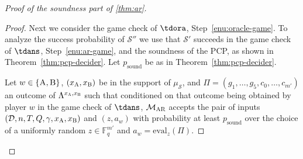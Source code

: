 \documentclass[11pt]{article}
\theoremstyle{definition}
\newcommand{\F}{\ensuremath{\mathbb{F}}}
\newcommand{\sampler}{\mathcal{S}}
\newcommand{\decider}{\mathcal{D}}
\newcommand{\strategy}{\mathscr{S}}
\newcommand{\gamestyle}[1]{\ensuremath{\textsc{#1}}\xspace}
\newcommand{\ar}{\gamestyle{AR}}
\newcommand{\labelstyle}[1]{\ensuremath{\textsc{#1}}\xspace}
\newcommand{\alice}{\labelstyle{A}}
\newcommand{\bob}{\labelstyle{B}}
\newcommand{\eval}{\mathrm{eval}}
\newcommand{\pcpverifier}{\mathcal{M}_\ar}
\newcommand{\qlen}{Q}
\newcommand{\soundness}{\mathrm{sound}}
\begin{document}
\begin{proof}[Proof of the soundness part of \cref{thm:ar}]
\begin{proof}
  Next we consider the game check of $\tdora$,
  Step~\ref{enu:oracle-game}.
  To analyze the success probability of $\strategy''$ we use that $\strategy'$
  succeeds in the game check of $\tdans$, Step~\ref{enu:ar-game}, and the
  soundness of the PCP, as shown in Theorem~\ref{thm:pcp-decider}.
  Let $p_{\soundness}$ be as in Theorem~\ref{thm:pcp-decider}.

  Let $w\in\{\alice,\bob\}$, $(x_\alice,x_\bob)$ be in the support of
  $\mu_\sampler$, and $\Pi = (g_1,\ldots,g_5,c_0,\ldots,c_{m'})$ an outcome of
  $\Lambda^{x_\alice,x_\bob}$ such that conditioned on that outcome being
  obtained by player $w$ in the game check of $\tdans$, $\pcpverifier$
  accepts the pair of inputs $(\decider, n , T, \qlen, \gamma, x_{\alice}, x_{\bob})$
  and $(z, a_{w} )$ with probability at least $p_{\soundness}$ over the choice of
  a uniformly random $z\in \F_q^{m'}$ and $a_w = \eval_z(\Pi)$.
			

\end{proof}
\end{proof}
\end{document}
